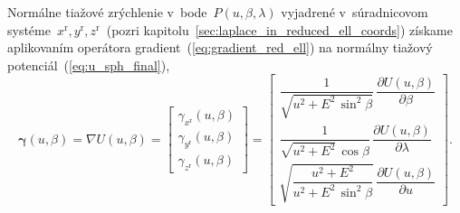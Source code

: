 \documentclass[a4paper, 12pt]{book}
\begin{document}
Normálne tiažové zrýchlenie v~bode~$P(u, \beta, \lambda)$ vyjadrené 
v~súradnicovom systéme~$x^\mathrm{r}, y^\mathrm{r}, z^\mathrm{r}$~(pozri 
kapitolu~\ref{sec:laplace_in_reduced_ell_coords}) získame aplikovaním operátora 
gradient~(\ref{eq:gradient_red_ell}) na normálny tiažový 
potenciál~(\ref{eq:u_sph_final}),
%
\begin{equation}
\label{eq:gamma_vec_general}
\boldsymbol \gamma(u, \beta) = \nabla U(u, \beta)
%
=
%
\begin{bmatrix}
\gamma_{x^\mathrm{r}}(u, \beta)\\
\gamma_{y^\mathrm{r}}(u, \beta)\\
\gamma_{z^\mathrm{r}}(u, \beta)
\end{bmatrix}
%
=
%
\begin{bmatrix}
\dfrac{1}{\sqrt{u^2 + E^2 \, \sin^2\beta}} \, \dfrac{\partial U(u, 
\beta)}{\partial \beta}\\[2ex]
\dfrac{1}{\sqrt{u^2 + E^2} \, \cos\beta} \, \dfrac{\partial U(u, 
\beta)}{\partial \lambda}\\[2ex]
\sqrt{\dfrac{u^2 + E^2}{u^2 + E^2 \, \sin^2\beta}} \, \dfrac{\partial U(u, 
\beta)}{\partial u}
\end{bmatrix}
%
{.}
\end{equation}
\end{document}
